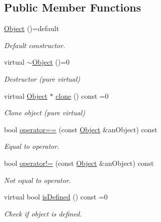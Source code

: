 \subsection*{Public Member Functions}
\begin{DoxyCompactItemize}
\item 
\hyperlink{classostk_1_1math_1_1geom_1_1d2_1_1_object_a5e2d37e51e0028b18188078e13932f34}{Object} ()=default
\begin{DoxyCompactList}\small\item\em Default constructor. \end{DoxyCompactList}\item 
virtual \hyperlink{classostk_1_1math_1_1geom_1_1d2_1_1_object_a661d5d407b327b22d3139884a93eebf9}{$\sim$\+Object} ()=0
\begin{DoxyCompactList}\small\item\em Destructor (pure virtual) \end{DoxyCompactList}\item 
virtual \hyperlink{classostk_1_1math_1_1geom_1_1d2_1_1_object}{Object} $\ast$ \hyperlink{classostk_1_1math_1_1geom_1_1d2_1_1_object_a98dedc6792aef35308966ca768eb3e14}{clone} () const =0
\begin{DoxyCompactList}\small\item\em Clone object (pure virtual) \end{DoxyCompactList}\item 
bool \hyperlink{classostk_1_1math_1_1geom_1_1d2_1_1_object_aa26e3719b4b10fc5c65d047a91cf0f51}{operator==} (const \hyperlink{classostk_1_1math_1_1geom_1_1d2_1_1_object}{Object} \&an\+Object) const
\begin{DoxyCompactList}\small\item\em Equal to operator. \end{DoxyCompactList}\item 
bool \hyperlink{classostk_1_1math_1_1geom_1_1d2_1_1_object_a10e035f09ac34d04901485d494681ff6}{operator!=} (const \hyperlink{classostk_1_1math_1_1geom_1_1d2_1_1_object}{Object} \&an\+Object) const
\begin{DoxyCompactList}\small\item\em Not equal to operator. \end{DoxyCompactList}\item 
virtual bool \hyperlink{classostk_1_1math_1_1geom_1_1d2_1_1_object_a456cc7121218d24c1322d0fe54230cc4}{is\+Defined} () const =0
\begin{DoxyCompactList}\small\item\em Check if object is defined. \end{DoxyCompactList}\item 

\end{DoxyCompactItemize}
